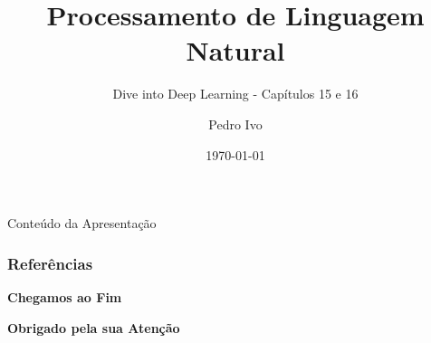 \documentclass[aspectratio=169,xcolor=dvipsnames]{beamer}
\title{Processamento de Linguagem Natural}
\subtitle{Dive into Deep Learning - Capítulos 15 e 16}
\author{Pedro Ivo}
\institute{CPE727 -- Aprendizado Profundo \\ Programa de Engenharia Elétrica -- COPPE/UFRJ}
\date{\today}
\begin{document}
\begin{frame}[plain]
    \titlepage
\end{frame}

\begin{frame}{Conteúdo da Apresentação}
    \tableofcontents
\end{frame}











\begin{frame}[allowframebreaks]
\frametitle{Referências}
    \tiny
    \nocite{*}
    
    
\end{frame}


\begin{frame}
    \Huge{\centerline{\textbf{Chegamos ao Fim}}}
    \Huge{\centerline{\textbf{Obrigado pela sua Atenção}}}
\end{frame}



\end{document}
